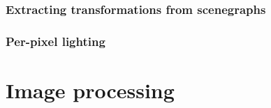 \documentclass[10pt,a4paper]{article}
\begin{document}
\section{Extracting transformations from scenegraphs}


\section{Per-pixel lighting}

\part{Image processing}
\end{document}
